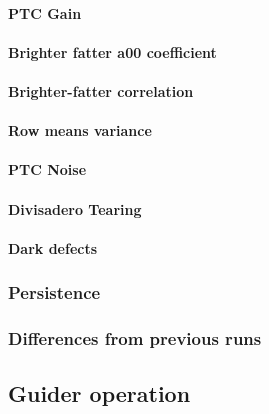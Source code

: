 \paragraph{PTC Gain}\label{ptc-gain-2}

\paragraph{\texorpdfstring{Brighter fatter a{00}
coefficient}{Brighter fatter a00 coefficient}}\label{brighter-fatter-a00-coefficient-2}

\paragraph{Brighter-fatter
correlation}\label{brighter-fatter-correlation-1}

\paragraph{Row means variance}\label{row-means-variance-1}

\paragraph{PTC Noise}\label{ptc-noise-1}

\paragraph{Divisadero Tearing}\label{divisadero-tearing-2}

\paragraph{Dark defects}\label{dark-defects-2}

\subsubsection{Persistence}\label{persistence-2}

\subsubsection{Differences from previous
runs}\label{differences-from-previous-runs-2}

\subsection{Guider operation}\label{guider-operation}

